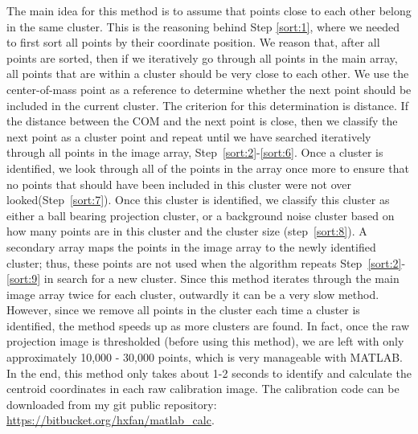 The main idea for this method is to assume that points close to each other belong in the same cluster.  This is the reasoning behind Step \ref{sort:1}, where we needed to first sort all points by their coordinate position.  We reason that, after all points are sorted, then if we iteratively go through all points in the main array, all points that are within a cluster should be very close to each other.  We use the center-of-mass point as a reference to determine whether the next point should be included in the current cluster.  The criterion for this determination is distance.  If the distance between the COM and the next point is close, then we classify the next point as a cluster point and repeat until we have searched iteratively through all points in the image array, Step~\ref{sort:2}-\ref{sort:6}.  Once a cluster is identified, we look through all of the points in the array once more to ensure that no points that should have been included in this cluster were not over looked(Step~\ref{sort:7}).  Once this cluster is identified, we classify this cluster as either a ball bearing projection cluster, or a background noise cluster based on how many points are in this cluster and the cluster size (step~\ref{sort:8}).  A secondary array maps the points in the image array to the newly identified cluster; thus, these points are not used when the algorithm repeats Step~\ref{sort:2}-\ref{sort:9} in search for a new cluster.  Since this method iterates through the main image array twice for each cluster, outwardly it can be a very slow method.  However, since we remove all points in the cluster each time a cluster is identified, the method speeds up as more clusters are found.  In fact, once the raw projection image is thresholded (before using this method), we are left with only approximately 10,000 - 30,000 points, which is very manageable with MATLAB.  In the end, this method only takes about 1-2 seconds to identify and calculate the centroid coordinates in each raw calibration image.  The calibration code can be downloaded from my git public repository: \hyperref[]{\url{https://bitbucket.org/hxfan/matlab_calc}}.

